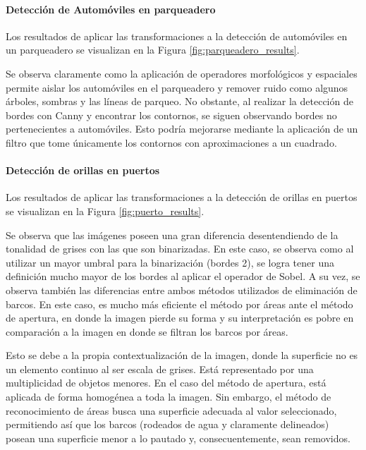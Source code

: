 \paragraph{Detección de Automóviles en parqueadero} Los resultados de aplicar las transformaciones a la detección de automóviles en un parqueadero se visualizan en la Figura \ref{fig:parqueadero_results}.


Se observa claramente como la aplicación de operadores morfológicos y espaciales permite aislar los automóviles en el parqueadero y remover ruido como algunos árboles, sombras y las líneas de parqueo. No obstante, al realizar la detección de bordes con Canny y encontrar los contornos, se siguen observando bordes no pertenecientes a automóviles. Esto podría mejorarse mediante la aplicación de un filtro que tome únicamente los contornos con aproximaciones a un cuadrado.\\

\paragraph{Detección de orillas en puertos} Los resultados de aplicar las transformaciones a la detección de orillas en puertos se visualizan en la Figura \ref{fig:puerto_results}.

Se observa que las imágenes poseen una gran diferencia desentendiendo de la tonalidad de grises con las que son binarizadas. En este caso, se observa como al utilizar un mayor umbral para la binarización (bordes 2), se logra tener una definición mucho mayor de los bordes al aplicar el operador de Sobel. A su vez, se observa también las diferencias entre ambos métodos utilizados de eliminación de barcos. En este caso, es mucho más eficiente el método por áreas ante el método de apertura, en donde la imagen pierde su forma y su interpretación es pobre en comparación a la imagen en donde se filtran los barcos por áreas.

Esto se debe a la propia contextualización de la imagen, donde la superficie no es un elemento continuo al ser escala de grises. Está representado por una multiplicidad de objetos menores. En el caso del método de apertura, está aplicada de forma homogénea a toda la imagen. Sin embargo, el método de reconocimiento de áreas busca una superficie adecuada al valor seleccionado, permitiendo así que los barcos (rodeados de agua y claramente delineados) posean una superficie menor a lo pautado y, consecuentemente, sean removidos.\\

